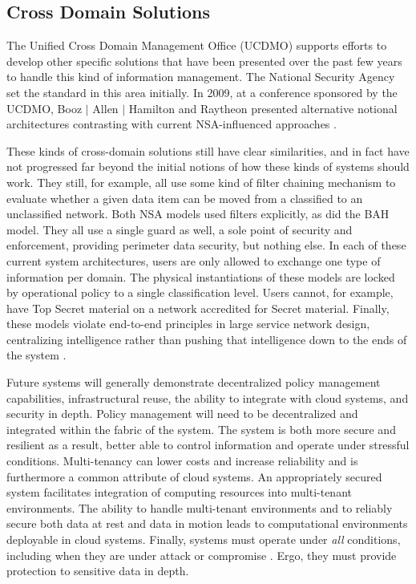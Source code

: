 \subsection{Cross Domain Solutions}
The Unified Cross Domain Management Office (UCDMO) supports efforts to develop other specific solutions that have been presented over the past few years to handle this kind of information management.  The National Security Agency set the standard in this area initially.  In 2009, at a conference sponsored by the UCDMO, Booz $\mid$ Allen $\mid$ Hamilton and Raytheon presented alternative notional architectures contrasting with current NSA-influenced approaches \cite{proposal:nsa-arch,proposal:gig-arch,proposal:bah-arch,proposal:raytheon-arch}.

These kinds of cross-domain solutions still have clear similarities, and in fact have not progressed far beyond the initial notions of how these kinds of systems should work.  They still, for example, all use some kind of filter chaining mechanism to evaluate whether a given data item can be moved from a classified to an unclassified network.  Both NSA models used filters explicitly, as did the BAH model.  They all use a single guard as well, a sole point of security and enforcement, providing perimeter data security, but nothing else.  In each of these current system architectures, users are only allowed to exchange one type of information per domain.  The physical instantiations of these models are locked by operational policy to a single classification level.  Users cannot, for example, have Top Secret material on a network accredited for Secret material.  Finally, these models violate end-to-end principles in large service network design, centralizing intelligence rather than pushing that intelligence down to the ends of the system \cite{Blumenthal:2001:RDI:383034.383037}.

Future systems will generally demonstrate decentralized policy management capabilities, infrastructural reuse, the ability to integrate with cloud systems, and security in depth.  Policy management will need to be decentralized and integrated within the fabric of the system.  The system is both more secure and resilient as a result, better able to control information and operate under stressful conditions.  Multi-tenancy can lower costs and increase reliability and is furthermore a common attribute of cloud systems.  An appropriately secured system facilitates integration of computing resources into multi-tenant environments.  The ability to handle multi-tenant environments and to reliably secure both data at rest and data in motion leads to computational environments deployable in cloud systems.  Finally, systems must operate under \textit{all} conditions, including when they are under attack or compromise \cite{proposal:ron-ross}.  Ergo, they must provide protection to sensitive data in depth.

